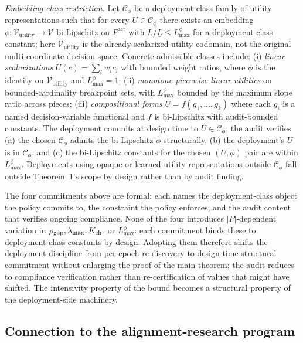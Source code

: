 \emph{Embedding-class restriction.}  Let $\mathcal{C}_\phi$ be a
deployment-class family of utility representations such that for
every $U \in \mathcal{C}_\phi$ there exists an embedding $\phi:
\mathcal{V}_{\mathrm{utility}} \to \mathcal{V}$ bi-Lipschitz on
$P^{\mathrm{act}}$ with $\bar{L}/\underline{L} \leq L_{\max}^\phi$
for a deployment-class constant; here
$\mathcal{V}_{\mathrm{utility}}$ is the already-scalarized
utility codomain, not the original multi-coordinate decision
space. Concrete admissible classes include: (i) \emph{linear
scalarizations} $U(c) = \sum_i w_i c_i$ with bounded weight
ratios, where $\phi$ is the identity on
$\mathcal{V}_{\mathrm{utility}}$ and $L_{\max}^\phi = 1$; (ii)
\emph{monotone piecewise-linear utilities} on bounded-cardinality
breakpoint sets, with $L_{\max}^\phi$ bounded by the maximum
slope ratio across pieces; (iii) \emph{compositional forms} $U =
f(g_1, \ldots, g_k)$ where each $g_i$ is a named decision-variable
functional and $f$ is bi-Lipschitz with audit-bounded constants.
The deployment commits at design time to $U \in \mathcal{C}_\phi$;
the audit verifies (a) the chosen $\mathcal{C}_\phi$ admits the
bi-Lipschitz $\phi$ structurally, (b) the deployment's $U$ is in
$\mathcal{C}_\phi$, and (c) the bi-Lipschitz constants for the
chosen $(U, \phi)$ pair are within $L_{\max}^\phi$. Deployments
using opaque or learned utility representations outside
$\mathcal{C}_\phi$ fall outside Theorem~1's scope by design
rather than by audit finding.

The four commitments above are formal: each names the
deployment-class object the policy commits to, the constraint
the policy enforces, and the audit content that verifies
ongoing compliance. None of the four introduces $|P|$-dependent
variation in $\rho_{\mathrm{gap}}, \lambda_{\max}, K_{\mathrm{ch}}$, or
$L_{\max}^\phi$: each commitment binds these to deployment-class
constants by design. Adopting them therefore shifts the
deployment discipline from per-epoch re-discovery to design-time
structural commitment without enlarging the proof of the main
theorem; the audit reduces to compliance verification rather
than re-certification of values that might have shifted. The
intensivity property of the bound becomes a structural property
of the deployment-side machinery.

\subsection{Connection to the alignment-research program}
\label{sec:disc_alignment}

